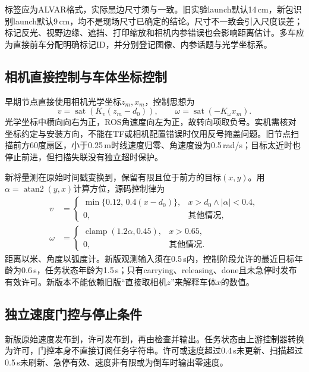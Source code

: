 标签应为ALVAR格式，实际黑边尺寸须与一致。旧实验launch默认14\,cm，新包识别launch默认9\,cm，均不是现场尺寸已确定的结论。尺寸不一致会引入尺度误差；标记反光、视野边缘、遮挡、打印缩放和相机内参错误也会影响距离估计。多车应为直接前车分配明确标记ID，并分别登记图像、内参话题与光学坐标系。

\subsection{相机直接控制与车体坐标控制}
早期节点直接使用相机光学坐标$z_m,x_m$，控制思想为
\begin{equation}
v=\operatorname{sat}\!\left(K_v(z_m-d_0)\right),\qquad
\omega=\operatorname{sat}\!\left(-K_\omega x_m\right).
\end{equation}
光学坐标中横向向右为正，ROS角速度向左为正，故转向项取负号。实机需核对坐标约定与安装方向，不能在TF或相机配置错误时仅用反号掩盖问题。旧节点扫描前方60度扇区，小于0.25\,m时线速度归零、角速度设为0.5\,rad/s；目标太近时也停止前进，但扫描失联没有独立超时保护。

新将量测在原始时间戳变换到，保留有限且位于前方的目标$(x,y)$。用$\alpha=\operatorname{atan2}(y,x)$计算方位，源码控制律为
\begin{align}
v&=\begin{cases}\min\{0.12,\,0.4(x-d_0)\},&x>d_0\land|\alpha|<0.4,\\0,&\text{其他情况},\end{cases}\\
\omega&=\begin{cases}\operatorname{clamp}(1.2\alpha,0.45),&x>0.65,\\0,&\text{其他情况}.\end{cases}
\end{align}
距离以米、角度以弧度计。新版观测输入须在0.5\,s内，控制阶段允许的最近目标年龄为0.6\,s，任务状态年龄为1.5\,s；只有carrying、releasing、done且未急停时发布有效许可。新版本不能依赖旧版“直接取相机$z$”来解释车体$x$的数值。

\subsection{独立速度门控与停止条件}
新版原始速度发布到，许可发布到，再由检查并输出。任务状态由上游控制器转换为许可，门控本身不直接订阅任务字符串。许可或速度超过0.4\,s未更新、扫描超过0.5\,s未刷新、急停有效、速度非有限或为倒车时输出零速度。

